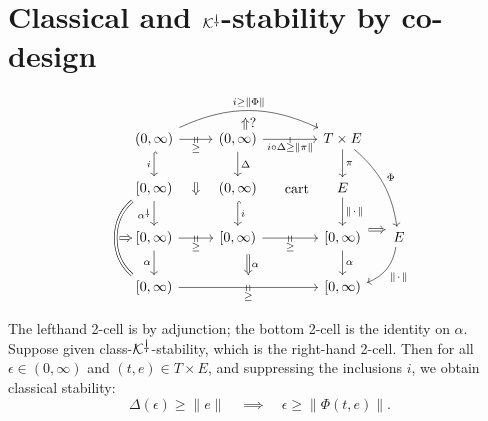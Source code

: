 \documentclass[11pt, one side, article]{memoir}
\theoremstyle{definition}
\theoremstyle{plain}
\newcommand{\cat}[1]{\mathcal{#1}}%
\newcommand{\ldag}{^{\rotatebox{180}{$\dagger$}}}
\newcommand{\blank}[1][1pt]{\hspace{#1}\cdot\hspace{#1}}
\newcommand{\K}{\cat{K}}
\newcommand{\Kdag}[1][0]{\K\ldag}
\newcommand{\tick}{\shortmid}
\newcommand{\ttick}{\shortmid\shortmid}
\begin{document}
\chapter{Classical and $\Kdag$-stability by co-design}
\label{}

\[
\begin{tikzcd}
	{(0,\infty)}
		\ar[d, hook, "i"']\ar[r, "\ttick"{marking, name=A1}, "\geq" below=1pt]
		\ar[rr, bend left=25pt, "i\geq \|\Phi\|", ""' name=D1]
	&
	|[alias=D2]|{(0,\infty)}
		\ar[d, "\Delta"]
		\ar[r, "\tick"{marking}, "i\circ\Delta\geq\|\pi\|"']
	&[15pt]
	T\times E
		\ar[d, "\pi"]\ar[ddr, bend left=20pt, "\Phi"]
	\\
	{[0,\infty)}
		\ar[dd, shift right=5pt, bend right=50pt, equal, "" name=C1]\ar[d, "\alpha\ldag"']
	&
	{(0,\infty)}
		\ar[d, hook, "i"]
	&
	E
		\ar[l, phantom, "\text{cart}"]
		\ar[d, "\|\blank\|"]
	\\
	|[alias=C2]|{[0,\infty)}
		\ar[r, "\ttick"{marking, name=A2}, "\geq" below=1pt]
		\ar[d, "\alpha"']
	&
	|[alias=B1]|{[0,\infty)}
		\ar[r, "\ttick"{marking}, "\geq" below=1pt]
	&
	{[0,\infty)}
		\ar[d, "\alpha"]\ar[r, Rightarrow, yshift=6pt, shorten=1pt]
	&[-10pt]
	E
		\ar[dl, bend left, "\|\blank\|"]
	\\
	{[0,\infty)}\ar[rr, "\ttick"{marking, name=B2}, "\geq" below=1pt]
	&&
	{[0,\infty)}
		\ar[from=A1, to=A2, Rightarrow, shorten=25pt]
		\ar[from=B1.south-|B2, to=B2, Rightarrow, shorten=3pt, "\alpha"]
		\ar[from=C1, to=C2, Rightarrow, shorten=-2pt]
		\ar[from=D1, to=D1|-D2, pos=.3, phantom, "\Uparrow?"]
\end{tikzcd}
\]

The lefthand 2-cell is by adjunction; the bottom 2-cell is the identity on $\alpha$. Suppose given class-$\Kdag$-stability, which is the right-hand 2-cell. Then for all $\epsilon\in(0,\infty)$ and $(t,e)\in T\times E$, and suppressing the inclusions $i$, we obtain classical stability:
\[
  \Delta(\epsilon)\geq \|e\|
  \quad\implies\quad
	\epsilon\geq\|\Phi(t,e)\|.
\]
\end{document}

